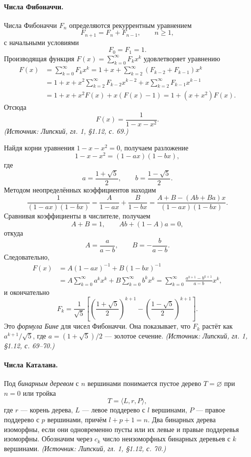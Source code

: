 \documentclass[a4paper,12pt]{article}
\begin{document}
\paragraph{Числа Фибоначчи.}
Числа Фибоначчи \(F_n\) определяются рекуррентным уравнением
\[
F_{n+1}=F_n+F_{n-1},\qquad n\ge1,
\]
с начальными условиями
\[
F_0=F_1=1.
\]
Производящая функция \(F(x)=\sum_{k=0}^{\infty}F_kx^k\) удовлетворяет уравнению
\[
\begin{aligned}
F(x)&=\sum_{k=0}^{\infty}F_kx^k=1+x+\sum_{k=2}^{\infty}(F_{k-2}+F_{k-1})x^k\\
&=1+x+x^2\sum_{k=2}^{\infty}F_{k-2}x^{k-2}+x\sum_{k=2}^{\infty}F_{k-1}x^{k-1}\\
&=1+x+x^2F(x)+x(F(x)-1)=1+(x+x^2)F(x).
\end{aligned}
\]
Отсюда
\[
F(x)=\frac{1}{1-x-x^2}.
\]
\textit{(Источник: Липский, гл. 1, §1.12, с. 69.)}

Найдя корни уравнения \(1-x-x^2=0\), получаем разложение
\[
1-x-x^2=(1-ax)(1-bx),
\]
где
\[
a=\frac{1+\sqrt5}{2},\qquad b=\frac{1-\sqrt5}{2}.
\]
Методом неопределённых коэффициентов находим
\[
\frac{1}{(1-ax)(1-bx)}=\frac{A}{1-ax}+\frac{B}{1-bx}
=\frac{A+B-(Ab+Ba)x}{(1-ax)(1-bx)}.
\]
Сравнивая коэффициенты в числителе, получаем
\[
A+B=1,\qquad Ab+(1-A)a=0,
\]
откуда
\[
A=\frac{a}{a-b},\qquad B=-\frac{b}{a-b}.
\]
Следовательно,
\[
\begin{aligned}
F(x)&=A(1-ax)^{-1}+B(1-bx)^{-1}\\
&=A\sum_{k=0}^{\infty}a^kx^k+B\sum_{k=0}^{\infty}b^kx^k
=\sum_{k=0}^{\infty}\frac{a^{k+1}-b^{k+1}}{a-b}x^k,
\end{aligned}
\]
и окончательно
\[
F_k=\frac{1}{\sqrt5}\left[\left(\frac{1+\sqrt5}{2}\right)^{k+1}-\left(\frac{1-\sqrt5}{2}\right)^{k+1}\right].
\]
Это \emph{формула Бине} для чисел Фибоначчи. Она показывает, что \(F_k\) растёт как \(a^{k+1}/\sqrt5\), где \(a=(1+\sqrt5)/2\) --- золотое сечение.
\textit{(Источник: Липский, гл. 1, §1.12, с. 69--70.)}

\paragraph{Числа Каталана.}
Под \emph{бинарным деревом} с \(n\) вершинами понимается пустое дерево \(T=\varnothing\) при \(n=0\) или тройка
\[
T=\langle L,r,P\rangle,
\]
где \(r\) --- корень дерева, \(L\) --- левое поддерево с \(l\) вершинами, \(P\) --- правое поддерево с \(p\) вершинами, причём \(l+p+1=n\). Два бинарных дерева изоморфны, если они одновременно пусты или их левые и правые поддеревья изоморфны. Обозначим через \(c_k\) число неизоморфных бинарных деревьев с \(k\) вершинами.
\textit{(Источник: Липский, гл. 1, §1.12, с. 70.)}
\end{document}
